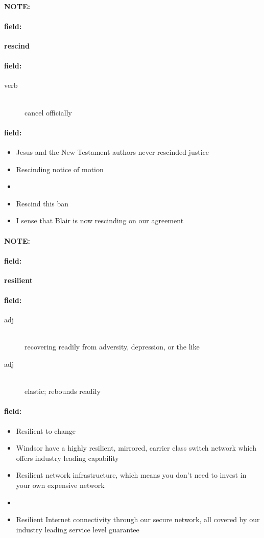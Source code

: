 \documentclass[12pt]{article}
\newenvironment{note}{\paragraph{NOTE:}}{}
\newenvironment{field}{\paragraph{field:}}{}
\begin{document}
\begin{note}
\begin{field}
\textbf{\large rescind}
\end{field}


\begin{field}
\begin{description}
\item[verb] \hfill \\ 
cancel officially

\end{description}
\end{field}

\begin{field}
\begin{itemize}
\item Jesus and the New Testament authors never rescinded justice
\item Rescinding notice of motion
\item 
\item Rescind this ban
\item I sense that Blair is now rescinding on our agreement
\end{itemize}
\end{field}
\end{note}
\begin{note}
\begin{field}
\textbf{\large resilient}
\end{field}


\begin{field}
\begin{description}
\item[adj] \hfill \\ 
recovering readily from adversity, depression, or the like

\item[adj] \hfill \\ 
elastic; rebounds readily

\end{description}
\end{field}

\begin{field}
\begin{itemize}
\item Resilient to change
\item Windsor have a highly resilient, mirrored, carrier class switch network which offers industry leading capability
\item Resilient network infrastructure, which means you don't need to invest in your own expensive network
\item 
\item Resilient Internet connectivity through our secure network, all covered by our industry leading service level guarantee
\end{itemize}
\end{field}
\end{note}
\end{document}
